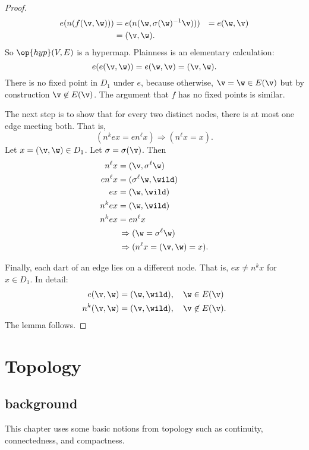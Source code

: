 \begin{proof}  
\begin{align*}
e(n(f(\v,\w))) &= e(n(\w,\sigma(\w)^{-1} \v))) &=
e(\w,\v)\\ 
&= (\v,\w).
\end{align*}
So $\op{hyp}(V,E)$ is a hypermap. 
Plainness is an elementary calculation:
\[ e(e(\v,\w)) = e(\w,\v) = (\v,\w).\] 
There is no fixed point in $D_1$ under $e$, because otherwise, $\v = \w\in E(\v)$
but by construction $\v\not\in E(\v)$.  The argument that $f$ has no
fixed points is similar.

The next step is to show that for every two distinct nodes, there
is at most one edge meeting both.  That is,
\[ (n^k e x = e n^\ell x)\Rightarrow (n^\ell x =
x).\]  Let $x = (\v,\w)\in D_1$.  Let
$\sigma=\sigma(\v)$. Then
\begin{align*}
n^\ell x &= (\v,\sigma^\ell \w)\\
e n^\ell x &= (\sigma^\ell \w,\wild )\\
e x &= (\w,\wild )\\
n^k e x &= (\w,\wild )\\
n^k e x &= e n^\ell x \\&\,\Rightarrow (\w = \sigma^\ell \w) \\&\,\Rightarrow
(n^\ell x = (\v,\w) = x).
\end{align*}

Finally,  each dart of an edge lies on a different node.
That is, $e x \ne n^k x$ for $x\in D_1$.   In detail:
\begin{align*}
e(\v,\w) &= (\w,\wild ),\quad \w\in E(\v)\\
n^k(\v,\w) &= (\v,\wild ),\quad \v\not\in E(\v).
\end{align*}
The lemma follows.
\end{proof}

\section{Topology}\label{sec:topology}

\subsection{background}

This chapter uses some basic
notions from topology such as continuity, connectedness, and compactness.

